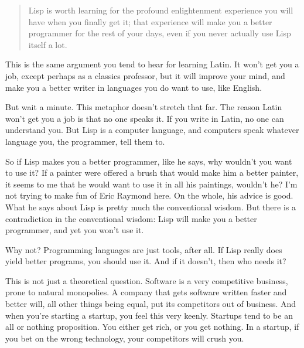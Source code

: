                   \begin{quote}

                    Lisp is worth learning for the profound enlightenment
                    experience you will have when you finally get it; that
                    experience will make you a better programmer for the rest of
                    your days, even if you never actually use Lisp itself a lot.
                  
\end{quote}

                  This is the same argument you tend to hear for learning Latin.
                  It won't get you a job, except perhaps as a classics
                  professor, but it will improve your mind, and make you a
                  better writer in languages you do want to use, like
                  English.

But wait a minute. This metaphor doesn't
                  stretch that far. The reason Latin won't get you a job is that
                  no one speaks it. If you write in Latin, no one can understand
                  you. But Lisp is a computer language, and computers speak
                  whatever language you, the programmer, tell them to.

So
                  if Lisp makes you a better programmer, like he says, why
                  wouldn't you want to use it? If a painter were offered a brush
                  that would make him a better painter, it seems to me that he
                  would want to use it in all his paintings, wouldn't he? I'm
                  not trying to make fun of Eric Raymond here. On the whole, his
                  advice is good. What he says about Lisp is pretty much the
                  conventional wisdom. But there is a contradiction in the
                  conventional wisdom: Lisp will make you a better programmer,
                  and yet you won't use it.

Why not? Programming
                  languages are just tools, after all. If Lisp really does yield
                  better programs, you should use it. And if it doesn't, then
                  who needs it?

This is not just a theoretical
                  question. Software is a very competitive business, prone to
                  natural monopolies. A company that gets software written
                  faster and better will, all other things being equal, put its
                  competitors out of business. And when you're starting a
                  startup, you feel this very keenly. Startups tend to be an all
                  or nothing proposition. You either get rich, or you get
                  nothing. In a startup, if you bet on the wrong technology,
                  your competitors will crush you.

